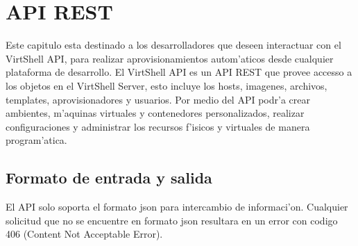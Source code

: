 \chapter{API REST}
\label{capapi}

Este capitulo esta destinado a los desarrolladores que deseen interactuar con el VirtShell API, para realizar aprovisionamientos autom'aticos desde cualquier plataforma de desarrollo. El VirtShell API es un API REST que provee accesso a los objetos en el VirtShell Server, esto incluye los hosts, imagenes, archivos, templates, aprovisionadores y usuarios. Por medio del API podr'a crear ambientes, m'aquinas virtuales y contenedores personalizados, realizar configuraciones y administrar los recursos f'isicos y virtuales de manera program'atica. 

\section{Formato de entrada y salida}
El API solo soporta el formato json para intercambio de informaci'on. Cualquier solicitud que no se encuentre en formato json resultara en un error con codigo 406 (Content Not Acceptable Error).















